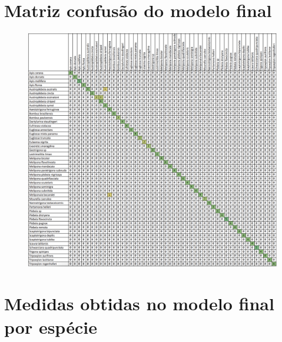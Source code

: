 \documentclass[
	12pt,				%
	oneside,			%
	a4paper,			%
	english,			%
	brazil				%
	]{abntex2ppgsi}
\begin{document}


%
%


\begin{apendicesenv}


\chapter{Matriz confusão do modelo final}

\begin{figure}[ht]
    \centering
    \includegraphics[width=1.1\textwidth, angle=270]{imagens/apendice/confusion_matrix.png}
\end{figure}

\chapter{Medidas obtidas no modelo final por espécie}


\end{apendicesenv}
\end{document}
